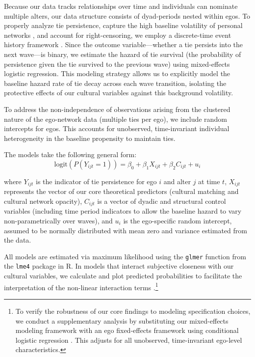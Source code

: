 \documentclass[
  letterpaper,
  DIV=11,
  numbers=noendperiod]{scrartcl}
\begin{document}
Because our data tracks relationships over time and individuals can nominate multiple alters, our data structure consists of dyad-periods nested within egos. To properly analyze tie persistence, capture the high baseline volatility of personal networks \citep{cornwell2021tracking, weiss2022life}, and account for right-censoring, we employ a discrete-time event history framework \citep{singer1993s}. Since the outcome variable—whether a tie persists into the next wave—is binary, we estimate the hazard of tie survival (the probability of persistence given the tie survived to the previous wave) using mixed-effects logistic regression. This modeling strategy allows us to explicitly model the baseline hazard rate of tie decay across each wave transition, isolating the protective effects of our cultural variables against this background volatility.

To address the non-independence of observations arising from the clustered nature of the ego-network data (multiple ties per ego), we include random intercepts for egos. This accounts for unobserved, time-invariant individual heterogeneity in the baseline propensity to maintain ties. 

The models take the following general form:
\begin{equation}
\text{logit}(P(Y_{ijt} = 1)) = \beta_0 + \beta_1 X_{ijt} + \beta_2 C_{ijt} + u_i
\end{equation}

where $Y_{ijt}$ is the indicator of tie persistence for ego $i$ and alter $j$ at time $t$, $X_{ijt}$ represents the vector of our core theoretical predictors (cultural matching and cultural network opacity), $C_{ijt}$ is a vector of dyadic and structural control variables (including time period indicators to allow the baseline hazard to vary non-parametrically over waves), and $u_i$ is the ego-specific random intercept, assumed to be normally distributed with mean zero and variance estimated from the data.

All models are estimated via maximum likelihood using the \texttt{glmer} function from the \texttt{lme4} package in \textsf{R}. In models that interact subjective closeness with our cultural variables, we calculate and plot predicted probabilities to facilitate the interpretation of the non-linear interaction terms \citep{mize2019best}.\footnote{To verify the robustness of our core findings to modeling specification choices, we conduct a supplementary analysis by substituting our mixed-effects modeling framework with an ego fixed-effects framework using conditional logistic regression \citep{graubard2011conditional-502}. This adjusts for all unobserved, time-invariant ego-level characteristics.}
\end{document}
